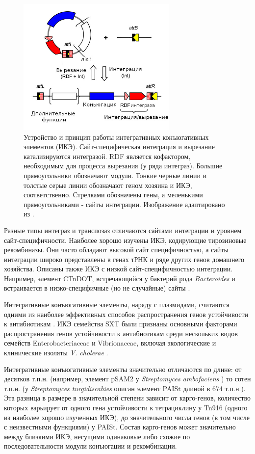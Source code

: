 \begin{figure}[!ht] 
  \center
  \includegraphics [width=0.7\textwidth] {Dissertation/images/lit/ice.jpg}
  \caption{Устройство и принцип работы интегративных конъюгативных элементов (ИКЭ). Сайт-специфическая интеграция и вырезание катализируются интегразой. RDF является кофактором, необходимым для процесса вырезания (у ряда интеграз). Большие прямоугольники обозначают модули. Тонкие черные линии и толстые серые линии обозначают геном хозяина и ИКЭ, соответственно. Стрелками обозначены гены, а меленькими прямоугольниками - сайты интеграции. Изображение адаптировано из \cite{bellanger2014conjugative}.} 
  \label{img:ice}  
\end{figure}

Разные типы интеграз и транспозаз отличаются сайтами интеграции и уровнем сайт-специфичности. Наиболее хорошо изучены ИКЭ, кодирующие тирозиновые рекомбиназы. Они часто обладают высокой сайт специфичностью, а сайты интеграции широко представлены в генах тРНК и ряде других генов домашнего хозяйства. Описаны также ИКЭ с низкой сайт-специфичностью интеграции. Например, элемент CTnDOT, встречающийся у бактерий рода \textit{Bacteroides} и встраивается в низко-специфичные (но не случайные) сайты \cite{cheng2000integration}. 

Интегративные конъюгативные элементы, наряду с плазмидами, считаются одними из наиболее эффективных способов распространения генов устойчивости к антибиотикам \cite{botelho2020role}. ИКЭ семейства SXT были признаны основными факторами распространения генов устойчивости к антибиотикам среди нескольких видов семейств Enterobacteriaceae и Vibrionaceae, включая экологические и клинические изоляты \textit{V. cholerae} \cite{carraro2015biology}. 

Интегративные конъюгативные элементы значительно отличаются по длине: от десятков т.п.н. (например, элемент pSAM2 у \textit{Streptomyces ambofaciens} \cite{pernodet1984plasmids}) то сотен т.п.н. (у \textit{Streptomyces turgidiscabies} описан элемент PAISt длиной в 674 т.п.н.\cite{kers2005large}). Эта разница в размере в значительной степени зависит от карго-генов, количество которых варьирует от одного гена устойчивости к тетрациклину у Tn916 (одного из наиболее хорошо изученных ИКЭ), до значительного числа генов (в том числе с неизвестными функциями) у PAISt. Состав карго-генов может значительно между близкими ИКЭ, несущими одинаковые либо схожие по последовательности модули конъюгации и рекомбинации. 

